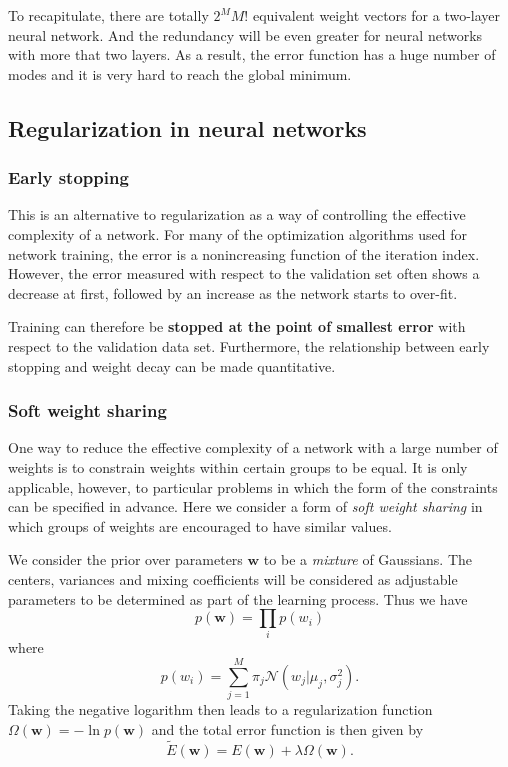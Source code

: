 \documentclass[a4paper]{report}
\renewcommand{\bf}{\mathbf}
\renewcommand{\cal}{\mathcal}
\newcommand{\imp}[1]{{\color{blue}\textit{#1}}}
\begin{document}
To recapitulate, there are totally $2^M M!$ equivalent weight vectors for a two-layer neural network. And the redundancy will be even greater for neural networks with more that two layers. As a result, the error function has a huge number of modes and it is very hard to reach the global minimum.
\subsection{Regularization in neural networks}
\subsubsection{Early stopping}
This is an alternative to regularization as a way of controlling the effective complexity of a network. For many of the optimization algorithms used for network training, the error is a nonincreasing function of the iteration index. However, the error measured with respect to the validation set often shows a decrease at first, followed by an increase as the network starts to over-fit.

Training can therefore be \textbf{stopped at the point of smallest error} with respect to the validation data set. Furthermore, the relationship between early stopping and weight decay can be made quantitative.

\subsubsection{Soft weight sharing}
One way to reduce the effective complexity of a network with a large number of weights is to constrain weights within certain groups to be equal. It is only applicable, however, to particular problems in which the form of the constraints can be specified in advance. Here we consider a form of \imp{soft weight sharing} in which groups of weights are encouraged to have similar values.

We consider the prior over parameters $\bf{w}$ to be a \imp{mixture} of Gaussians. The centers, variances and mixing coefficients will be considered as adjustable parameters to be determined as part of the learning process. Thus we have
\begin{equation}
	p(\bf{w}) = \prod_i p(w_i)
\end{equation}
where
\begin{equation}
	p(w_i) = \sum_{j=1}^M \pi_j \cal{N}(w_j|\mu_j,\sigma_j^2).
\end{equation}
Taking the negative logarithm then leads to a regularization function $\Omega(\bf{w}) = - \ln p(\bf{w})$ and the total error function is then given by
\begin{equation}
	\tilde{E}(\bf{w}) = E(\bf{w}) + \lambda \Omega(\bf{w}).
\end{equation}
\end{document}
